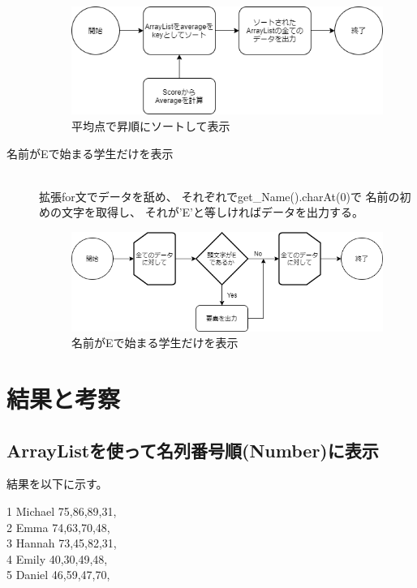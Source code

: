 \documentclass[dvipdfmx]{jsarticle}
\begin{document}
\begin{description}
    \begin{figure}[H]
      \centering
      \includegraphics[width=15cm]{../pic/fc5.png}
      \caption{平均点で昇順にソートして表示}
    \end{figure}

    \item[名前がEで始まる学生だけを表示]\mbox{}\\
    拡張for文でデータを舐め、
    それぞれでget\_Name().charAt(0)で
    名前の初めの文字を取得し、
    それが'E'と等しければデータを出力する。

    \begin{figure}[H]
      \begin{center}
        \includegraphics[width=15cm]{../pic/fc6.png}
        \caption{名前がEで始まる学生だけを表示}
      \end{center}
    \end{figure}
    
  \end{description}

\section{結果と考察}

\subsection{ArrayListを使って名列番号順(Number)に表示}
結果を以下に示す。
\begin{screen}
  1   Michael 75,86,89,31,\\
  2      Emma 74,63,70,48,\\
  3    Hannah 73,45,82,31,\\
  4     Emily 40,30,49,48,\\
  5    Daniel 46,59,47,70,
\end{screen}
\end{document}
